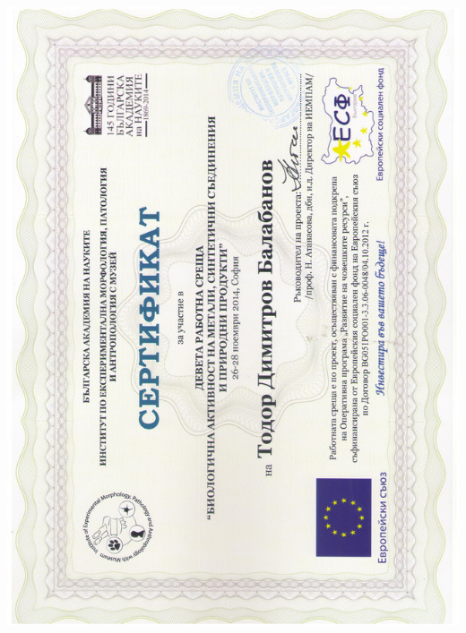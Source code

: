 \documentclass[english,a4paper]{europasscv}
\begin{document}
\includegraphics[width=\textwidth,height=\textheight,keepaspectratio]{IEMPAM2014_4}
\end{document}
